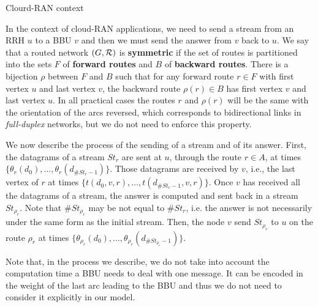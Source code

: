 \documentclass[10pt]{article}
\begin{document}
      \begin{subsection}{Clourd-RAN context}
     
      In the context of cloud-RAN applications, we need to send a stream from an RRH $u$ to a BBU $v$ and then 
      we must send the answer from $v$ back to $u$. We say that a routed network $(G, {\cal R})$ is \textbf{symmetric} if the set of routes is partitioned into the sets $F$ of \textbf{forward routes} and $B$ of \textbf{backward routes}. There is a bijection $\rho$ between $F$ and $B$ such that for any forward route $r \in F$ with first vertex $u$ and last vertex $v$, the backward route $\rho(r) \in B$ has first vertex $v$ and last vertex $u$. In all practical cases the routes $r$ and $\rho(r)$ will be the same with the orientation of the arcs reversed, which corresponds to bidirectional links in \emph{full-duplex} networks, but we do not need to enforce this property.
      
     We now describe the process of the sending of a stream and of its answer. First, the datagrams of a stream $St_r$ are sent at $u$, through the route $r \in A$, at times $\{\theta_r(d_0),\ldots,\theta_r(d_{\#St_r-1}) \}$.
      Those datagrams are received by $v$, i.e., the last vertex of $r$ at times $\{t(d_0,v,r),\ldots,t(d_{\#St_r-1},v,r)\}$. 
     Once $v$ has received all the datagrams of a stream, the answer is computed and sent back in a stream $St_{\rho_r}$. Note that $\#St_{\rho_r}$ may be not equal to $\#St_r$, i.e. the answer is not necessarily under the same form as the initial stream. Then, the node $v$ send $St_{\rho_r}$ to  $u$ on the route $\rho_r$ at times $\{\theta_{\rho_r}(d_0),\ldots,\theta_{\rho_r}(d_{\#St_{\rho_r}-1}) \}$.
     

     Note that, in the process we describe, we do not take into account the computation time a BBU needs to deal with one message. It can be encoded in the weight of the last arc leading to the BBU and thus we do not need to consider it explicitly in our model. 

     \end{subsection}
\end{document}
